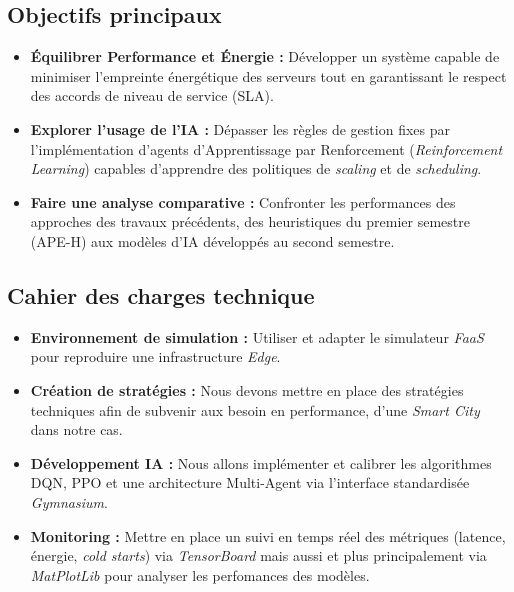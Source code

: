 
\subsection{Objectifs principaux}
\begin{itemize}
    \item \textbf{Équilibrer Performance et Énergie :} Développer un système capable de minimiser l'empreinte énergétique des serveurs tout en garantissant le respect des accords de niveau de service (SLA).
    \item \textbf{Explorer l'usage de l'IA :} Dépasser les règles de gestion fixes par l'implémentation d'agents d'Apprentissage par Renforcement (\textit{Reinforcement Learning}) capables d'apprendre des politiques de \textit{scaling} et de \textit{scheduling}.
    \item \textbf{Faire une analyse comparative :} Confronter les performances des approches des travaux précédents, des heuristiques du premier semestre (APE-H) aux modèles d'IA développés au second semestre.
\end{itemize}

\subsection{Cahier des charges technique}
\begin{itemize}
    \item \textbf{Environnement de simulation :} Utiliser et adapter le simulateur \textit{FaaS} pour reproduire une infrastructure \textit{Edge}.
    \item \textbf{Création de stratégies :} Nous devons mettre en place des stratégies techniques afin de subvenir aux besoin en performance, d'une \textit{Smart City} dans notre cas.
    \item \textbf{Développement IA :} Nous allons implémenter et calibrer les algorithmes DQN, PPO et une architecture Multi-Agent via l'interface standardisée \textit{Gymnasium}.
    \item \textbf{Monitoring :} Mettre en place un suivi en temps réel des métriques (latence, énergie, \textit{cold starts}) via \textit{TensorBoard} mais aussi et plus principalement via \textit{MatPlotLib} pour analyser les perfomances des modèles.
\end{itemize}
